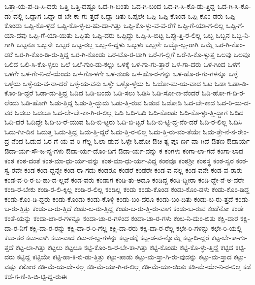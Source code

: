 {ಒತ್ತಾ-ಯ-ಪ-ಡಿ-ಸಿ-ದರು
ಒತ್ತಿ
ಒತ್ತಿ-ದಷ್ಟೂ
ಒದ-ಗಿ-ಬಂತು
ಒದ-ಗಿ-ಬಂದ
ಒದ-ಗಿ-ಸಿ-ಕೊ-ಡು-ತ್ತಿದ್ದ
ಒದ-ಗಿ-ಸಿ-ಕೊ-ಡು-ವಲ್ಲಿ
ಒದ್ದಾಗ
ಒದ್ದಾ-ಡ-ಬೇ-ಕಾ-ಗು-ತ್ತದೆ
ಒದ್ದಾ-ಡಿತು
ಒಪ್ಪಲೇ
ಒಪ್ಪಿ
ಒಪ್ಪಿ-ಕೊಂಡ
ಒಪ್ಪಿ-ಕೊಂ-ಡರು
ಒಪ್ಪಿ-ಕೊಂಡು
ಒಪ್ಪಿ-ಕೊ-ಳ್ಳದೆ
ಒಪ್ಪಿ-ಕೊ-ಳ್ಳ-ಬ-ಹು-ದಾ-ಗಿತ್ತು
ಒಪ್ಪಿ-ಕೊ-ಳ್ಳು-ವ-ವ-ರೆಗೆ
ಒಪ್ಪಿ-ಗೆ-ಯಾ-ಗ-ಲಿಲ್ಲ
ಒಪ್ಪಿ-ಗೆ-ಯಾ-ದವು
ಒಪ್ಪಿ-ಗೆ-ಯಾ-ಯಿತು
ಒಪ್ಪಿತು
ಒಪ್ಪಿ-ದರು
ಒಪ್ಪಿದ್ದು
ಒಪ್ಪಿ-ಸಿ-ಬಿಟ್ಟ
ಒಪ್ಪು-ತ್ತಿ-ರ-ಲಿಲ್ಲ
ಒಬ್ಬ
ಒಬ್ಬನ
ಒಬ್ಬ-ನಿ-ಗಾಗಿ
ಒಬ್ಬನೂ
ಒಬ್ಬನೇ
ಒಬ್ಬರ
ಒಬ್ಬ-ರಲ್ಲ
ಒಬ್ಬ-ಳಿ-ದ್ದಳು
ಒಬ್ಬಳು
ಒಬ್ಬಳೇ
ಒಬ್ಬೊ-ಬ್ಬ-ರಾಗಿ
ಒಮ್ಮೆ
ಒರ-ಗಿ-ಕೊಂ-ಡರೆ
ಒರ-ಗಿ-ಕೊಂ-ಡಿ-ರು-ತ್ತಿದ್ದ
ಒರ-ಗಿ-ಕೊಂಡು
ಒರ-ಟೊ-ರ-ಟಾಗಿ
ಒರೆ-ಗ-ಲ್ಲಿಗೆ
ಒರೆ-ಸಿ-ಕೊ-ಳ್ಳುತ್ತ
ಒಲವು
ಒಲವೂ
ಒಲಿದ
ಒಲಿ-ಸಿ-ಕೊ-ಳ್ಳಲು
ಒಲೆ
ಒಲೆ-ಗುಂ-ಡು-ಕಲ್ಲು
ಒಳಕ್ಕೆ
ಒಳ-ಗಾ-ಗು-ತ್ತಾರೆ
ಒಳ-ಗಾ-ದರು
ಒಳ-ಗಿಂದ
ಒಳಗೆ
ಒಳಗೇ
ಒಳ-ಗೇ-ನಿ-ದೆ-ಯೆಂದು
ಒಳ-ಗೊ-ಳಗೇ
ಒಳ-ಶುಂಠಿ
ಒಳ-ಹೊ-ರ-ಗನ್ನು
ಒಳ-ಹೊ-ರ-ಗು-ಗಳನ್ನೂ
ಒಳ್ಳೆ
ಒಳ್ಳೆಯ
ಒಳ್ಳೆ-ಯ-ವ-ನಾ-ದರೆ
ಒಳ್ಳೆ-ಯ-ವನು
ಒಳ್ಳೇ
ಒಳ್ಳೊ-ಳ್ಳೆಯ
ಓ
ಓಜೋ-ಮ-ಯ-ವಾದ
ಓಟ
ಓಡಾ
ಓಡಾ-ಡಿ-ಕೊಂ-ಡಿ-ದ್ದರೆ
ಓಡಾ-ಡು-ತ್ತಿದ್ದ
ಓಡಿದ
ಓಡಿ-ಬಂದು
ಓಡಿ-ಸಲು
ಓಡಿಸಿ
ಓಡಿ-ಸೋ-ಣ-ವೆಂದರೆ
ಓಡಿ-ಹೋ-ಗ-ದಿ-ರ-ಲೆಂದು
ಓಡಿ-ಹೋಗಿ
ಓಡು-ತ್ತಿದ್ದ
ಓಡು-ತ್ತಿ-ದ್ದುದು
ಓಡು-ತ್ತಿ-ರುವ
ಓಡುವ
ಓಡೋಡಿ
ಓದ-ಬೇ-ಕಾದ
ಓದ-ರಿ-ಯ-ದ-ವರ
ಓದಲು
ಓದಲೂ
ಓದ-ಲೇ-ಬೇ-ಕಾ-ಗಿ-ರ-ಲಿಲ್ಲ
ಓದಿ
ಓದಿ-ಓದಿ
ಓದಿ-ಕೊಂಡು
ಓದಿ-ಕೊ-ಳ್ಳು-ತ್ತಿ-ದ್ದಾಗ
ಓದಿದ
ಓದಿ-ದರೆ
ಓದಿದ್ದೇ
ಓದಿ-ಬ-ರೆ-ಯುವ
ಓದಿ-ಬಿ-ಟ್ಟರು
ಓದಿ-ಬಿ-ಟ್ಟರೆ
ಓದಿ-ಬಿ-ಟ್ಟಿ-ದ್ದ-ನೆಂ-ದರೆ
ಓದಿ-ರ-ಲಿಲ್ಲ
ಓದಿಸಿ
ಓದು-ಗೀ-ದಿನ
ಓದುತ್ತ
ಓದು-ತ್ತಿದ್ದ
ಓದು-ತ್ತಿ-ದ್ದರೆ
ಓದು-ತ್ತಿ-ರ-ಲಿಲ್ಲ
ಓದು-ತ್ತಿ-ರು-ವಂ-ತೆಯೇ
ಓದು-ತ್ತೇ-ನೆ-ನ-ರೇಂ-ದ್ರ-ನೆಂದ
ಓದುವ
ಓರ-ಗೆ-ಯ-ವ-ರಿ-ಗೆಲ್ಲ
ಓಲಾ-ಡುವ
ಓಳ್ಳೇ
ಓಹೋ
ಔಚಿ-ತ್ಯ-ಪೂ-ರ್ಣ-ವಾ-ಗಿದೆ
ಔತಣ
ಔದಾರ್ಯ
ಔದಾ-ರ್ಯ-ಸೌ-ಜ-ನ್ಯ-ಗಳು
ಔದಾ-ರ್ಯ-ದೊಂ-ದಿಗೆ
ಔದಾ-ರ್ಯ-ವನ್ನು
ಕ
ಕಂಗಳು
ಕಂಗಾ-ಲಾ-ಗದೆ
ಕಂಗಾ-ಲಾದ
ಕಂಠ
ಕಂಠ-ದಂತೆ
ಕಂಠ-ಮಾ-ಧು-ರ್ಯ-ವನ್ನು
ಕಂಠ-ಮಾ-ಧು-ರ್ಯ-ವಿದ್ದ
ಕಂಠವೂ
ಕಂಠಶ್ರೀ
ಕಂಠಸ್ಥ
ಕಂಠ-ಸ್ವರ
ಕಂಠ-ಸ್ವ-ರವೇ
ಕಂಡ
ಕಂಡ-ದ್ದನ್ನೇ
ಕಂಡ-ರಾ-ಗದು
ಕಂಡರೂ
ಕಂಡರೆ
ಕಂಡರೇ
ಕಂಡ-ವ-ನಲ್ಲ
ಕಂಡ-ವನೇ
ಕಂಡ-ವ-ರಾರು
ಕಂಡ-ವ-ರಿ-ರ-ಬ-ಹು-ದ-ಲ್ಲವೆ
ಕಂಡ-ವರು
ಕಂಡಾಗ
ಕಂಡಿ-ತು-ಅದೂ
ಕಂಡಿದ್ದ
ಕಂಡಿ-ದ್ದೀರಾ
ಕಂಡಿ-ದ್ದೇ-ನೆ-ಅ-ವರೇ
ಕಂಡಿ-ರ-ಬೇಕು
ಕಂಡಿ-ರ-ಲಿ-ಕ್ಕಿಲ್ಲ
ಕಂಡಿ-ರ-ಲಿಲ್ಲ
ಕಂಡಿಲ್ಲ
ಕಂಡು
ಕಂಡು-ಕೊಂಡ
ಕಂಡು-ಕೊಂ-ಡಳು
ಕಂಡು-ಕೊಂ-ಡಿದ್ದ
ಕಂಡು-ಕೊಂ-ಡಿ-ದ್ದರು
ಕಂಡು-ಕೊಂಡು
ಕಂಡು-ಕೊಳ್ಳಿ
ಕಂಡು-ಬಂ-ದರೂ
ಕಂಡು-ಬಂ-ದಿತು
ಕಂಡು-ಬ-ರು-ತ್ತದೆ
ಕಂಡು-ಬ-ರು-ತ್ತಿತ್ತು
ಕಂಡು-ಬ-ರು-ತ್ತಿದೆ
ಕಂಡು-ಬ-ರು-ತ್ತಿದ್ದ
ಕಂಡು-ಬ-ರು-ತ್ತಿ-ರು-ವಾಗ
ಕಂಡು-ಬ-ರುವ
ಕಂಡೆನೋ
ಕಂಡೇ
ಕಂತೆ-ಯನ್ನು
ಕಂದಾ-ಚಾ-ರ-ಗಳನ್ನೂ
ಕಂದಾ-ಚಾ-ರ-ಗಳಿಂದ
ಕಂದಾ-ಚಾ-ರ-ಗಳು
ಕಂಬ-ನಿ-ದುಂ-ಬಿತು
ಕಕ್ಷಿ-ದಾರ
ಕಕ್ಷಿ-ದಾ-ರ-ನಿಗೆ
ಕಕ್ಷಿ-ದಾ-ರ-ರನ್ನು
ಕಕ್ಷಿ-ದಾ-ರ-ರಿ-ಗೆಲ್ಲ
ಕಕ್ಷಿ-ದಾ-ರರು
ಕಕ್ಷಿ-ದಾ-ರ-ರೆಲ್ಲ
ಕಛೇ-ರಿ-ಗಳನ್ನು
ಕಛೇ-ರಿ-ಯಲ್ಲಿ
ಕಟು-ತರ
ಕಟು-ವಾಗಿ
ಕಟು-ವಾದ
ಕಟು-ಶ-ಬ್ದ-ಗಳನ್ನು
ಕಟ್ಟ-ಡಕ್ಕೆ
ಕಟ್ಟ-ಡ-ವ-ನ್ನೊಮ್ಮೆ
ಕಟ್ಟ-ದಿ-ದ್ದರೆ
ಕಟ್ಟ-ಬೇ-ಕಾ-ಗು-ತ್ತದೆ
ಕಟ್ಟ-ಲಾ-ಗಿತ್ತು
ಕಟ್ಟಲು
ಕಟ್ಟಲೂ
ಕಟ್ಟಿ-ಕೊಂ-ಡಿ-ರ-ಬೇ-ಕಾ-ಗಿತ್ತು
ಕಟ್ಟಿ-ಕೊಂಡು
ಕಟ್ಟಿ-ಕೊ-ಳ್ಳು-ತ್ತಿದ್ದೆ
ಕಟ್ಟಿದ
ಕಟ್ಟಿ-ದರು
ಕಟ್ಟಿದ್ದ
ಕಟ್ಟಿಯೇ
ಕಟ್ಟಿ-ಹಾ-ಕಿ-ಬಿ-ಡು-ತ್ತಿತ್ತು
ಕಟ್ಟು-ಪಾಡು
ಕಟ್ಟು-ಮ-ಸ್ತಾ-ಗಿ-ರು-ವುದನ್ನು
ಕಟ್ಟು-ಮ-ಸ್ತಾದ
ಕಟ್ಟು-ವಷ್ಟು
ಕಠೋರ
ಕಡಿ-ಮೆ-ಯ-ದೇ-ನಲ್ಲ
ಕಡಿ-ಮೆ-ಯಾ-ಗಿ-ರ-ಲಿಲ್ಲ
ಕಡಿ-ಮೆ-ಯಾ-ಯಿತು
ಕಡಿ-ಮೆ-ಯೇ-ನಿ-ರ-ಲಿಲ್ಲ
ಕಡೆ
ಕಡೆ-ಗ-ಣಿ-ಸಿ-ಬಿ-ಟ್ಟಿ-ದ್ದ-ರುಈ
}

